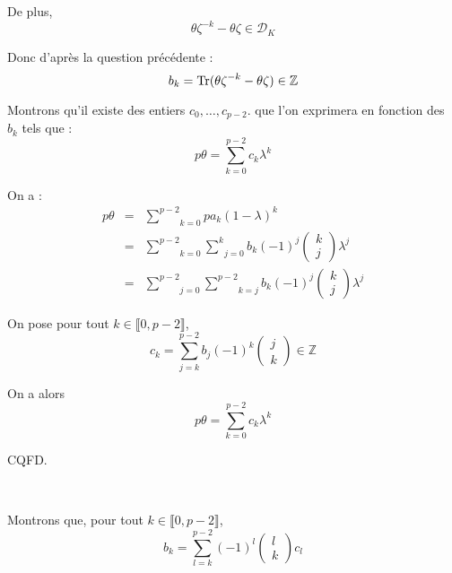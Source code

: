 De plus,
\[ \theta \zeta^{- k} - \theta \zeta \in \mathcal{D}_K \]


Donc d'apr{\`e}s la question pr{\'e}c{\'e}dente :
\[ b_k = \operatorname{Tr} (\theta \zeta^{- k} - \theta \zeta) \in \mathbb{Z} \]


 Montrons qu'il existe des entiers $c_0, \ldots, c_{p - 2}$.
que l'on exprimera en fonction des $b_k$ tels que :
\[ p \theta = \underset{k = 0}{\overset{p - 2}{\sum}} c_k \lambda^k \]


On a :
\begin{eqnarray*}
  p \theta & = & \underset{k = 0}{\overset{p - 2}{\sum}} p a_k (1 -
  \lambda)^k\\
  & = & \underset{k = 0}{\overset{p - 2}{\sum}} \underset{j =
  0}{\overset{k}{\sum}} b_k (- 1)^j \left( \begin{array}{c}
    k\\
    j
  \end{array} \right) \lambda^j\\
  & = & \underset{j = 0}{\overset{p - 2}{\sum}} \underset{k = j}{\overset{p -
  2}{\sum}} b_k (- 1)^j \left( \begin{array}{c}
    k\\
    j
  \end{array} \right) \lambda^j
\end{eqnarray*}


On pose pour tout $k \in \llbracket 0, p - 2 \rrbracket$,
\[ c_k = \underset{j = k}{\overset{p - 2}{\sum}} b_j (- 1)^k \left(
   \begin{array}{c}
     j\\
     k
   \end{array} \right) \in \mathbb{Z} \]


On a alors
\[ p \theta = \underset{k = 0}{\overset{p - 2}{\sum}} c_k \lambda^k \]
$\text{}$

CQFD.

\

Montrons que, pour tout $k \in \llbracket 0, p - 2 \rrbracket$,
\[ b_k = \underset{l = k}{\overset{p - 2}{\sum}} (- 1)^l \left(
   \begin{array}{c}
     l\\
     k
   \end{array} \right) c_l \]


